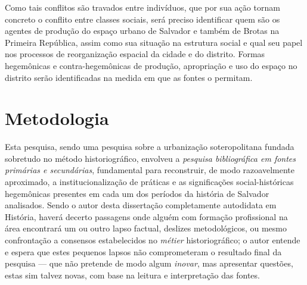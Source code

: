 Como tais conflitos são travados entre indivíduos, que por sua ação tornam concreto o conflito entre classes sociais, será preciso identificar quem são os agentes de produção do espaço urbano de Salvador e também de Brotas na Primeira República, assim como sua situação na estrutura social e qual seu papel nos processos de reorganização espacial da cidade e do distrito. Formas hegemônicas e contra-hegemônicas de produção, apropriação e uso do espaço no distrito serão identificadas na medida em que as fontes o permitam.

\section[Metodologia]{Metodologia}
\label{sec:metodo}

Esta pesquisa, sendo uma pesquisa sobre a urbanização soteropolitana fundada sobretudo no método historiográfico, envolveu a \textit{pesquisa bibliográfica em fontes primárias e secundárias}, fundamental para reconstruir, de modo razoavelmente aproximado, a institucionalização de práticas \cite{BERNARDO1991} e as significações social-históricas \cite{CASTORIADIS1982} hegemônicas presentes em cada um dos períodos da história de Salvador analisados. Sendo o autor desta dissertação completamente autodidata em História, haverá decerto passagens onde alguém com formação profissional na área encontrará um ou outro lapso factual, deslizes metodológicos, ou mesmo confrontação a consensos estabelecidos no \textit{métier} historiográfico; o autor entende e espera que estes pequenos lapsos não comprometeram o resultado final da pesquisa --- que não pretende de modo algum \textit{inovar}, mas apresentar questões, estas sim talvez novas, com base na leitura e interpretação das fontes.


